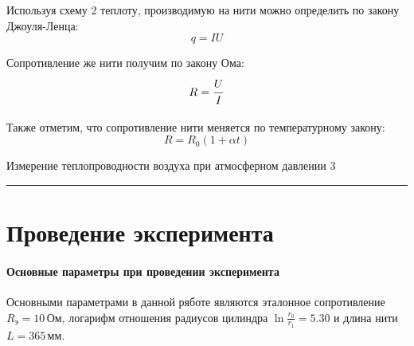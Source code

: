 \documentclass[12pt,a4paper]{scrartcl}
\begin{document}
	Используя схему 2 теплоту, производимую на нити можно определить по закону Джоуля-Ленца:
	$$q = IU$$
	
	Сопротивление же нити получим по закону Ома:
	$$R = \dfrac{\strut U}{\strut I}$$
	
	Также отметим, что сопротивление нити меняется по температурному закону:
	$$R = R_0(1 + \alpha t)$$
	\newpage 
	
	
	\begin{flushleft}
		\footnotesize{Измерение теплопроводности воздуха при атмосферном давлении} \hspace{\fill} \footnotesize{3}
		\\[-0.3cm]\noindent\rule{\textwidth}{0.3pt}
	\end{flushleft}

	\section{Проведение эксперимента}
	\paragraph{Основные параметры при проведении эксперимента} \hfill
	
	Основными параметрами в данной ряботе являются эталонное сопротивление $R_{\text{э}} = 10\, \text{Ом}$, логарифм отношения радиусов цилиндра $\ln \frac{r_0}{r_1} = 5.30$ и длина нити $L = 365\, \text{мм}$.
	\hspace{-1cm}
\end{document}
